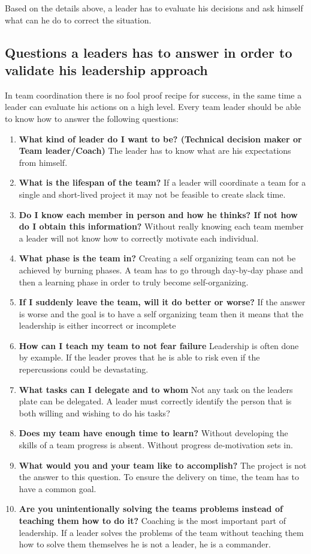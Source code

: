 Based on the details above, a leader has to evaluate his decisions and ask himself what can he do to correct the situation.
\subsection{Questions a leaders has to answer in order to validate his leadership approach}
In team coordination there is no fool proof recipe for success, in the same time a leader can evaluate his actions on a high level. Every team leader should be able to know how to answer the following questions:

\begin{enumerate}
\item \textbf{What kind of leader do I want to be? (Technical decision maker or Team leader/Coach)} The leader has to know what are his expectations from himself.
\item \textbf{What is the lifespan of the team?} If a leader will coordinate a team for a single and short-lived project it may not be feasible to create slack time.
\item \textbf{Do I know each member in person and how he thinks? If not how do I obtain this information?} Without really knowing each team member a leader will not know how to correctly motivate each individual.
\item \textbf{What phase is the team in?} Creating a self organizing team can not be achieved by burning phases. A team has to go through day-by-day phase and then a learning phase in order to truly become self-organizing.
\item \textbf{If I suddenly leave the team, will it do better or worse?} If the answer is worse and the goal is to have a self organizing team then it means that the leadership is either incorrect or incomplete
\item \textbf{How can I teach my team to not fear failure} Leadership is often done by example. If the leader proves that he is able to risk even if the repercussions could be devastating.
\item \textbf{What tasks can I delegate and to whom} Not any task on the leaders plate can be delegated. A leader must correctly identify the person that is both willing and wishing to do his tasks?
\item \textbf{Does my team have enough time to learn?} Without developing the skills of a team progress is absent. Without progress de-motivation sets in.
\item \textbf{What would you and your team like to accomplish?} The project is not the answer to this question. To ensure the delivery on time, the team has to have a common goal.
\item \textbf{Are you unintentionally solving the teams problems instead of teaching them how to do it?} Coaching is the most important part of leadership. If a leader solves the problems of the team without teaching them how to solve them themselves he is not a leader, he is a commander.
\end{enumerate}

